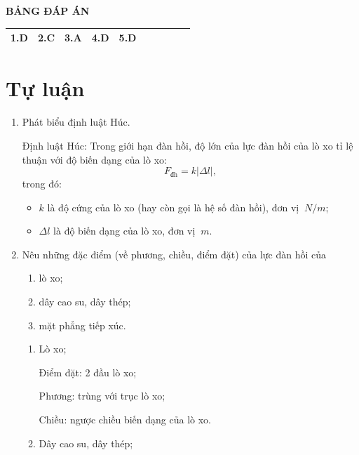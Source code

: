 \hideall
{
	\begin{center}
		\textbf{BẢNG ĐÁP ÁN}
	\end{center}
	\begin{center}
		\begin{tabular}{|m{2.8em}|m{2.8em}|m{2.8em}|m{2.8em}|m{2.8em}|m{2.8em}|m{2.8em}|m{2.8em}|m{2.8em}|m{2.8em}|}
			\hline
			1.D  & 2.C  & 3.A  & 4.D  & 5.D  &   &   &  & &  \\
			\hline
			
		\end{tabular}
	\end{center}
}
\section{Tự luận}
\begin{enumerate}[label=\bfseries Câu \arabic*:]
	\item {}
	
	
	{
		Phát biểu định luật Húc.
	}
	
	\hideall
	{	
			Định luật Húc: Trong giới hạn đàn hồi, độ lớn của lực đàn hồi của lò xo tỉ lệ thuận với độ biến dạng của lò xo:
		$$F_\text{đh} = k |\Delta l|,$$
		trong đó:
		\begin{itemize}
			\item $k$ là độ cứng của lò xo (hay còn gọi là hệ số đàn hồi), đơn vị $\SI{}{N/m}$;
			\item $\Delta l$ là độ biến dạng của lò xo, đơn vị $\SI{}{m}$.
		\end{itemize}
	}
	\item {}
	
	
	{
		Nêu những đặc điểm (về phương, chiều, điểm đặt) của lực đàn hồi của
		\begin{enumerate}
			\item lò xo;
			\item dây cao su, dây thép;
			\item mặt phẳng tiếp xúc.
		\end{enumerate}
	}
	
	\hideall
	{	
		\begin{enumerate}
			\item Lò xo;
			
			Điểm đặt: 2 đầu lò xo;
			
			Phương: trùng với trục lò xo;
			
			Chiều: ngược chiều biến dạng của lò xo.
			
			\item Dây cao su, dây thép;
			

\end{enumerate}}
\end{enumerate}
